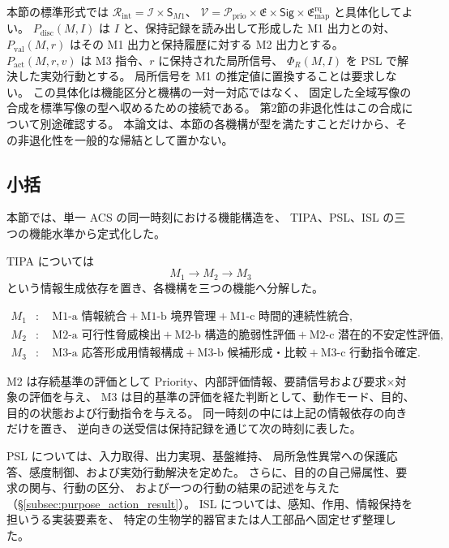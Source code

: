 \begin{definition}
\label{def:s4_primitive_composition}
本節の標準形式では $\mathcal R_{\mathrm{int}}=\mathcal I\times\mathsf S_{M1}$、
$\mathcal V=\mathcal P_{\mathrm{prio}}\times\mathfrak E\times\mathsf{Sig}\times\mathfrak E^{\mathrm{rq}}_{\mathrm{map}}$ と具体化してよい。
$P_{\mathrm{disc}}(M,I)$ は $I$ と、保持記録を読み出して形成した M1 出力との対、
$P_{\mathrm{val}}(M,r)$ はその M1 出力と保持履歴に対する M2 出力とする。
$P_{\mathrm{act}}(M,r,v)$ は M3 指令、$r$ に保持された局所信号、
$\Phi_R(M,I)$ を PSL で解決した実効行動とする。
局所信号を M1 の推定値に置換することは要求しない。
この具体化は機能区分と機構の一対一対応ではなく、
固定した全域写像の合成を標準写像の型へ収めるための接続である。
第2節の非退化性はこの合成について別途確認する。
本論文は、本節の各機構が型を満たすことだけから、その非退化性を一般的な帰結として置かない。
\end{definition}

\subsection{小括}
\label{subsec:s4_summary}

本節では、単一 ACS の同一時刻における機能構造を、
TIPA、PSL、ISL の三つの機能水準から定式化した。

TIPA については
\[
  M_1\longrightarrow M_2\longrightarrow M_3
\]
という情報生成依存を置き、各機構を三つの機能へ分解した。

\[
\begin{aligned}
M_1 &: \quad
\text{M1-a 情報統合}
+
\text{M1-b 境界管理}
+
\text{M1-c 時間的連続性統合},
\\
M_2 &: \quad
\text{M2-a 可行性脅威検出}
+
\text{M2-b 構造的脆弱性評価}
+
\text{M2-c 潜在的不安定性評価},
\\
M_3 &: \quad
\text{M3-a 応答形成用情報構成}
+
\text{M3-b 候補形成・比較}
+
\text{M3-c 行動指令確定}.
\end{aligned}
\]

M2 は存続基準の評価として Priority、内部評価情報、要請信号および要求×対象の評価を与え、
M3 は目的基準の評価を経た判断として、動作モード、目的、目的の状態および行動指令を与える。
同一時刻の中には上記の情報依存の向きだけを置き、
逆向きの送受信は保持記録を通じて次の時刻に表した。

PSL については、入力取得、出力実現、基盤維持、
局所急性異常への保護応答、感度制御、および実効行動解決を定めた。
さらに、目的の自己帰属性、要求の関与、行動の区分、
および一つの行動の結果の記述を与えた（\S\ref{subsec:purpose_action_result}）。
ISL については、感知、作用、情報保持を担いうる実装要素を、
特定の生物学的器官または人工部品へ固定せず整理した。

